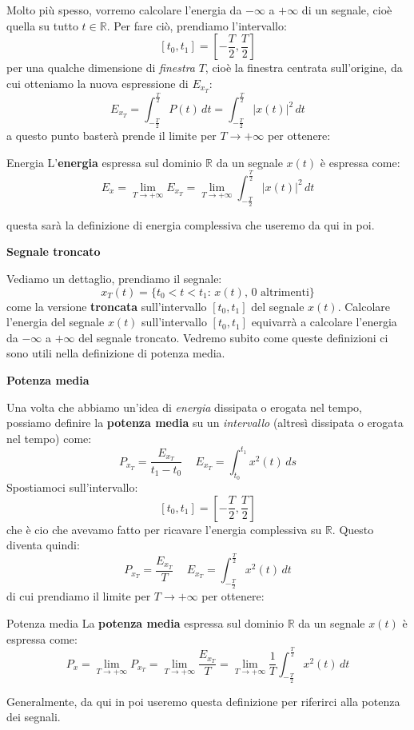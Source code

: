 \documentclass[a4paper,11pt]{article}
\begin{document}
Molto più spesso, vorremo calcolare l'energia da $-\infty$ a $+\infty$ di un segnale, cioè quella su tutto $t \in \mathbb{R}$. Per fare ciò, prendiamo l'intervallo:
$$
[t_0, t_1] = \left[-\frac{T}{2}, \frac{T}{2}\right] 
$$
per una qualche dimensione di \textit{finestra} $T$, cioè la finestra centrata sull'origine, da cui otteniamo la nuova espressione di $E_{x_T}$:
$$
E_{x_T} = \int_{-\frac{T}{2}}^{\frac{T}{2}} P(t) \, dt = \int_{-\frac{T}{2}}^{\frac{T}{2}} |x(t)|^2 \, dt
$$
a questo punto basterà prende il limite per $T \rightarrow + \infty$ per ottenere:
\begin{definition}{Energia}
L'\textbf{energia} espressa sul dominio $\mathbb{R}$ da un segnale $x(t)$ è espressa come:
$$
E_x = \lim_{T \rightarrow + \infty} E_{x_T} = \lim_{T \rightarrow + \infty} \int_{-\frac{T}{2}}^{\frac{T}{2}} |x(t)|^2 \, dt
$$
\end{definition}
questa sarà la definizione di energia complessiva che useremo da qui in poi.

\par\smallskip

\noindent
\textbf{\textsf{Segnale troncato}}

\noindent
Vediamo un dettaglio, prendiamo il segnale:
$$
x_T (t) = \{ t_0 < t < t_1 : \, x(t), \, 0 \text{ altrimenti} \}
$$
come la versione \textbf{troncata} sull'intervallo $[t_0, t_1]$ del segnale $x(t)$. Calcolare l'energia del segnale $x(t)$ sull'intervallo $[t_0, t_1]$ equivarrà a calcolare l'energia da $-\infty$ a $+\infty$ del segnale troncato. Vedremo subito come queste definizioni ci sono utili nella definizione di potenza media.

\par\smallskip

\noindent
\textbf{\textsf{Potenza media}}

\noindent
Una volta che abbiamo un'idea di \textit{energia} dissipata o erogata nel tempo, possiamo definire la \textbf{potenza media} su un \textit{intervallo} (altresì dissipata o erogata nel tempo) come:
$$
P_{x_T} = \frac{E_{x_T}}{t_1 - t_0} \, \quad E_{x_T} = \int_{t_0}^{t_1} x^2 (t) \, ds
$$
Spostiamoci sull'intervallo:
$$
[t_0, t_1] = \left[-\frac{T}{2}, \frac{T}{2}\right] 
$$
che è cio che avevamo fatto per ricavare l'energia complessiva su $\mathbb{R}$. Questo diventa quindi:
$$
P_{x_T} = \frac{E_{x_T}}{T} \, \quad E_{x_T} = \int_{-\frac{T}{2}}^{\frac{T}{2}} x^2 (t) \, dt
$$
di cui prendiamo il limite per $T \rightarrow + \infty$ per ottenere:
\begin{definition}{Potenza media}
La \textbf{potenza media} espressa sul dominio $\mathbb{R}$ da un segnale $x(t)$ è espressa come:	
$$
P_{x} = \lim_{T \rightarrow + \infty} P_{x_T} = \lim_{T \rightarrow + \infty} \frac{E_{x_T}}{T} = \lim_{T \rightarrow + \infty} \frac{1}{T} \int_{-\frac{T}{2}}^{\frac{T}{2}} x^2 (t) \, dt 
$$
\end{definition}
Generalmente, da qui in poi useremo questa definizione per riferirci alla potenza dei segnali. 
\end{document}
